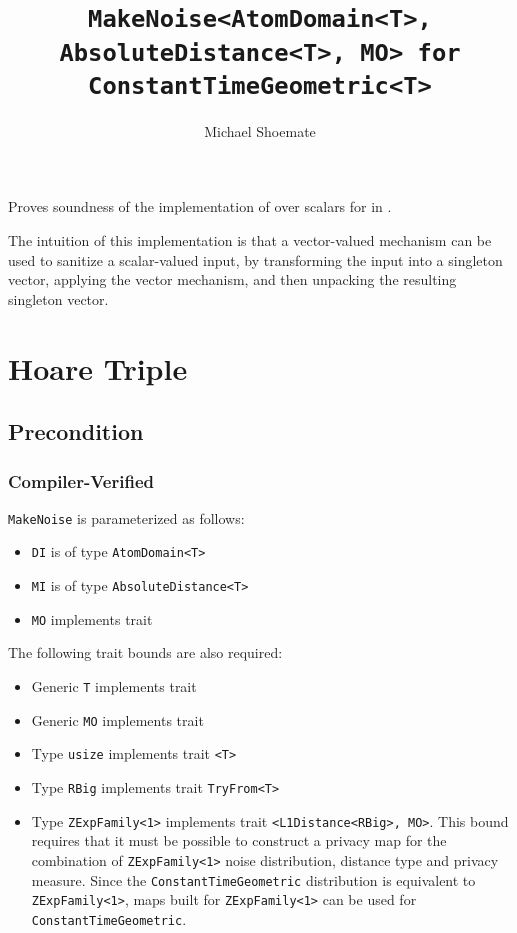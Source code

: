 \documentclass{article}
\title{\texttt{MakeNoise<AtomDomain<T>, AbsoluteDistance<T>, MO> for ConstantTimeGeometric<T>}}
\author{Michael Shoemate}
\date{}
\begin{document}
\maketitle

\contrib
Proves soundness of the implementation of  over scalars
for  in .

The intuition of this implementation is that a vector-valued mechanism can be used to sanitize a scalar-valued input,
by transforming the input into a singleton vector, 
applying the vector mechanism, and then unpacking the resulting singleton vector.

\section{Hoare Triple}
\subsection*{Precondition}
\subsubsection*{Compiler-Verified}

\texttt{MakeNoise} is parameterized as follows:
\begin{itemize}
    \item \texttt{DI} is of type \texttt{AtomDomain<T>}
    \item \texttt{MI} is of type \texttt{AbsoluteDistance<T>}
    \item \texttt{MO} implements trait 
\end{itemize}

The following trait bounds are also required:
\begin{itemize}
    \item Generic \texttt{T} implements trait 
    \item Generic \texttt{MO} implements trait 
    \item Type \texttt{usize} implements trait \texttt{<T>}
    \item Type \texttt{RBig} implements trait \texttt{TryFrom<T>}
    \item Type \texttt{ZExpFamily<1>} implements trait \texttt{<L1Distance<RBig>, MO>}.
        This bound requires that it must be possible to construct a privacy map for the combination of \texttt{ZExpFamily<1>} noise distribution, distance type and privacy measure.
        Since the \texttt{ConstantTimeGeometric} distribution is equivalent to \texttt{ZExpFamily<1>},
        maps built for \texttt{ZExpFamily<1>} can be used for \texttt{ConstantTimeGeometric}.
\end{itemize}
\end{document}
